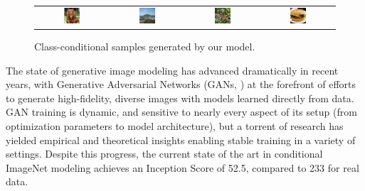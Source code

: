 \documentclass{article} %
\begin{document}
\begin{figure}[htbp]
\centering
\setlength{\tabcolsep}{1pt}
\begin{tabular}{cccc}
\includegraphics[width=0.24\textwidth]{images/samples0/dog3.jpg} & 
\includegraphics[width=0.24\textwidth]{images/samples0/landscape0.jpg} &
\includegraphics[width=0.24\textwidth]{images/samples0/Monarch0.jpg} & 
\includegraphics[width=0.24\textwidth]{images/samples0/Burger0.jpg} 
\end{tabular}
\caption{Class-conditional samples generated by our model.}
\label{samples0}
\end{figure}


The state of generative image modeling has advanced dramatically in recent years, with Generative Adversarial Networks (GANs, \citet{goodfellow2014gans}) at the forefront of efforts to generate high-fidelity, diverse images with models learned directly from data. GAN training is dynamic, and sensitive to nearly every aspect of its setup (from optimization parameters to model architecture), but a torrent of research has yielded empirical and theoretical insights enabling stable training in a variety of settings. Despite this progress, the current state of the art in conditional ImageNet modeling \citep{zhang2018sagan} achieves an Inception Score \citep{salimans2016improved} of 52.5, compared to 233 for real data.
\end{document}
